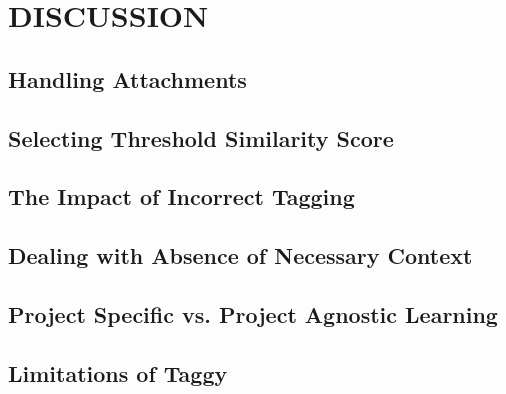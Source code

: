 \fancyhead[RO,LE]{\thepage}
\fancyfoot{} 
\chapter{DISCUSSION}
\section{Handling Attachments}
\section{Selecting Threshold Similarity Score}
\section{The Impact of Incorrect Tagging}
\section{Dealing with Absence of Necessary Context}
\section{Project Specific vs. Project Agnostic Learning}
\section{Limitations of Taggy}


